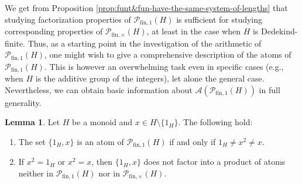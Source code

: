 \documentclass{report}
\renewcommand{\P}{\mathcal{P}}
\newcommand{\fin}{\textrm{fin}}
\newcommand{\funt}{{\textrm{fin}, \times}}
\newcommand{\fun}{{\textrm{fin}, 1}}
\renewcommand{\:}{\text{:}}
\theoremstyle{definition}
\newtheorem{lemma}[defn]{Lemma}
\begin{document}
%
We get from Proposition \ref{prop:funt&fun-have-the-same-system-of-lengths} that studying factorization properties of $\P_\fun(H)$ is sufficient for studying corresponding properties of $\P_\funt(H)$, at least in the case when $H$ is Dedekind-finite.
Thus, as a starting point in the investigation of the arithmetic of $\P_\fun(H)$, one might wish to give a comprehensive description of
the atoms of $\P_\fun(H)$.
This is however an overwhelming task even in specific cases (e.g., when $H$ is the additive group of the integers), let alone the general case. Nevertheless, we can obtain basic information about $\mathscr A(\P_\fun(H))$ in full generality.
%
%
\begin{lemma}\label{lem:2-elt-atoms}
	Let $H$ be a monoid and $x \in H \setminus \{1_H\}$.
	The following hold:
	\begin{enumerate}[label={\rm (\roman{*})}]
		\item\label{it:lem:2-elt-atoms(i)} The set $\{1_H, x\}$ is an atom of $\P_\fun(H)$ if and only if $1_H \ne x^2 \ne x$.
		\item\label{it:lem:2-elt-atoms(ii)} If $x^2=1_H$ or $x^2=x$, then $\{1_H,x\}$ does not factor into a product of atoms neither in $\P_{\fin,1}(H)$ nor in $\P_\funt(H)$.
	\end{enumerate}
\end{lemma}
%
\end{document}
